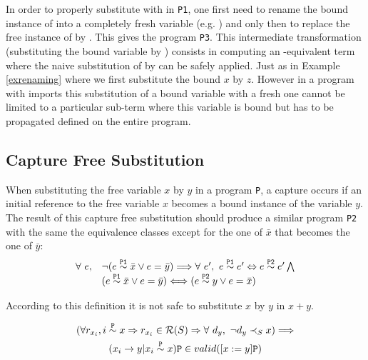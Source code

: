  In order to properly substitute  with  in {\tt P1}, one first need to rename the bound instance of  into a completely fresh variable (e.g. ) and only then to replace the free instance of  by . This gives the program {\tt P3}. This intermediate transformation (substituting the bound variable  by ) consists in computing an \a-equivalent term where the naive substitution of  by  can be safely applied. Just as in Example \ref{exrenaming} where we first substitute the bound $x$ by $z$. However in a program with imports this substitution of a bound variable with a fresh one cannot be limited to a particular sub-term where this variable is bound but has to be propagated defined on the entire program. 


\subsection{Capture Free Substitution}

\begin{definition} When substituting the free variable $x$ by $y$ in a program {\tt P}, a capture occurs if an initial reference to the free variable $x$ becomes a bound instance of the variable $y$. The result of this capture free substitution should produce a similar program {\tt P2} with the same the equivalence classes except for the one of $\bar{x}$ that becomes the one of $\bar{y}$:
$$
\begin{array}{rl}
\forall\ e,& \neg (e \stackrel{\text{\tt P1}}{\sim} \bar{x} \vee e = \bar{y}) \Longrightarrow \forall\ e',\ e \stackrel{\text{\tt P1}}{\sim} e' \Leftrightarrow e \stackrel{\text{\tt P2}}{\sim} e' \bigwedge \\
& (e \stackrel{\text{\tt P1}}{\sim} \bar{x} \vee e = \bar{y}) \Longleftrightarrow (e \stackrel{\text{\tt P2}}{\sim} y \vee e = \bar{x}) 
\end{array}
$$
\end{definition}
\begin{remark} According to this definition it is not safe to substitute $x$ by $y$ in $x + y$.
\end{remark}

\begin{lemma}
  \begin{multline*}
    (\forall r_{x_i}, i \stackrel{\text{\tt P}}{\sim} x \Rightarrow r_{x_i} \in \mathcal{R}(S) \Rightarrow \forall\ d_y,\ \neg d_y \prec_S x) \Longrightarrow \\
    (x_i \rightarrow y | x_i \stackrel{\text{\tt P}}{\sim} x)\text{\tt P} \in valid([x:=y]\text{\tt P})
  \end{multline*}
    
\end{lemma}
















